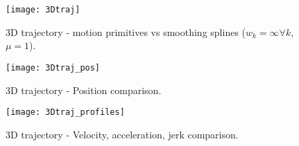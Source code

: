 \begin{figure}[H]
\centering
\texttt{[image: 3Dtraj]}
\caption{3D trajectory - motion primitives vs smoothing splines ($w_k=\infty\forall k$, $\mu=1$).}
\end{figure}

\begin{figure}[h]
\centering
\texttt{[image: 3Dtraj\_pos]}
\caption{3D trajectory - Position comparison.}
\end{figure}

\begin{figure}[h]
\centering
\texttt{[image: 3Dtraj\_profiles]}
\caption{3D trajectory - Velocity, acceleration, jerk comparison.}
\end{figure}